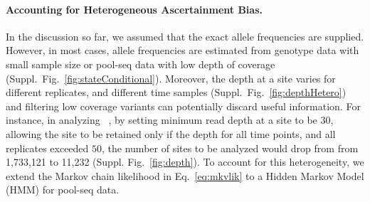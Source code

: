 \paragraph{Accounting for Heterogeneous Ascertainment Bias.}
In the discussion so far, we assumed that the exact allele frequencies
are supplied. However, in most cases, allele frequencies are estimated
from genotype data with small sample size or pool-seq data with low
depth of coverage (Suppl.~Fig.~\ref{fig:stateConditional}).  Moreover,
the depth at a site varies for different replicates, and different
time samples (Suppl.~Fig.~\ref{fig:depthHetero}) and filtering low coverage 
variants can potentially discard useful information.
For instance, in analyzing \datadm~\cite{orozco2012adaptation}, by setting 
minimum read depth at a site to 
be 30,
allowing the site to be retained only if the depth for all time points, and all 
replicates exceeded $50$, the number of sites to be analyzed
would drop from from 1,733,121 to 11,232 (Suppl. Fig.~\ref{fig:depth}). To 
account for this
heterogeneity, we extend the Markov chain likelihood in
Eq.~\ref{eq:mkvlik} to a Hidden Markov Model (HMM) for pool-seq data.


